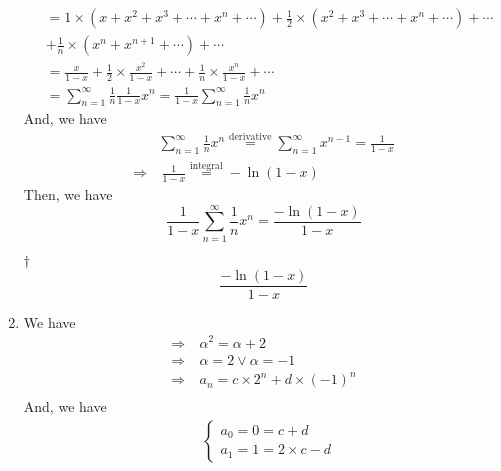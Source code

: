 \documentclass[a4paper,12pt]{article}
\begin{document}
\begin{enumerate}
\begin{equation}
\begin{aligned}
            & = 1 \times (x + x^2 + x^3 + \cdots + x^n + \cdots) + \frac{1}{2} \times (x^2 + x^3 + \cdots + x^n + \cdots) + \cdots \\
            & + \frac{1}{n} \times (x^n + x^{n + 1} + \cdots) + \cdots \\
            & = \frac{x}{1 - x} + \frac{1}{2} \times \frac{x^2}{1 - x} + \cdots + \frac{1}{n} \times \frac{x^n}{1 - x} + \cdots \\
            & = \sum_{n = 1}^{\infty}\frac{1}{n}\frac{1}{1 - x}x^n = \frac{1}{1 - x}\sum_{n = 1}^{\infty}\frac{1}{n}x^n
        \end{aligned}
    \end{equation} And, we have \begin{equation}
        \begin{aligned}
            & \sum_{n = 1}^{\infty}\frac{1}{n}x^n \overset{\text{derivative}}= \sum_{n = 1}^{\infty}x^{n - 1} = \frac{1}{1 - x} \\
            \Rightarrow & \ \frac{1}{1 - x} \overset{\text{integral}}= -\ln (1 - x)
        \end{aligned}
    \end{equation} Then, we have \begin{equation}
        \frac{1}{1 - x}\sum_{n = 1}^{\infty}\frac{1}{n}x^n = \frac{-\ln (1 - x)}{1 - x}
    \end{equation}
    \begin{answer}{$\dag$}\begin{equation}
            \frac{-\ln (1 - x)}{1 - x}
        \end{equation}
    \end{answer}
    \item We have \begin{equation}
        \begin{aligned}
            \Rightarrow & \ \alpha^2 = \alpha + 2 \\
            \Rightarrow & \ \alpha = 2 \lor \alpha = -1 \\
            \Rightarrow & \ a_n = c \times 2^n + d \times (-1)^n \\
        \end{aligned}
    \end{equation} And, we have \begin{equation}
        \begin{aligned}
            & \begin{cases}
                a_0 = 0 = c + d \\
                a_1 = 1 = 2 \times c - d

\end{cases}
\end{aligned}
\end{equation}
\end{enumerate}
\end{document}
